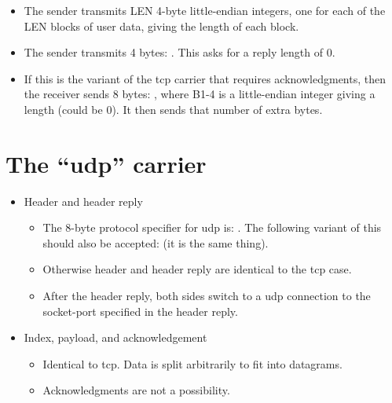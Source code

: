 \begin{itemize}
\begin{itemize}
  \item The sender transmits LEN 4-byte little-endian integers, one
    for each of the LEN blocks of user data, giving the length of each
    block.
      
  \item The sender transmits 4 bytes: . This asks for
    a reply length of 0.

  \item If this is the variant of the tcp carrier that requires
  acknowledgments, then the receiver sends 8 bytes: , where B1-4 is a little-endian integer giving a
  length (could be 0).  It then sends that number of extra bytes.

  \end{itemize}

\end{itemize}


\section{The ``udp'' carrier}


\begin{itemize}

\item{Header and header reply}

  \begin{itemize}
    
  \item The 8-byte protocol specifier for udp is: .  The following variant of this should also be
    accepted:  (it is the same
    thing).

  \item Otherwise header and header reply are identical to the tcp case.
  \item After the header reply, both sides switch to a udp connection
    to the socket-port specified in the header reply.

  \end{itemize}

\item{Index, payload, and acknowledgement}

  \begin{itemize}

  \item Identical to tcp.  Data is split arbitrarily to fit into
    datagrams.
    
  \item Acknowledgments are not a possibility.

  \end{itemize}

\end{itemize}


